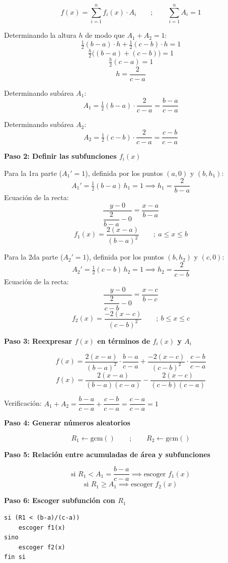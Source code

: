 \[
f(x) = \sum_{i=1}^{n} f_i(x) \cdot A_i \qquad ; \qquad \sum_{i=1}^{n} A_i = 1
\]

Determinando la altura $h$ de modo que $A_1 + A_2 = 1$:
\[
\tfrac{1}{2}(b-a)\cdot h + \tfrac{1}{2}(c-b)\cdot h = 1
\]
\[
\tfrac{h}{2}\big((b-a)+(c-b)\big) = 1
\]
\[
\tfrac{h}{2}(c-a) = 1
\]
\[
h = \frac{2}{c-a}
\]

Determinando subárea $A_1$:
\[
A_1 = \tfrac{1}{2}(b-a)\cdot\frac{2}{c-a} = \frac{b-a}{c-a}
\]

Determinando subárea $A_2$:
\[
A_2 = \tfrac{1}{2}(c-b)\cdot\frac{2}{c-a} = \frac{c-b}{c-a}
\]

\textbf{Paso 2: Definir las subfunciones $f_i(x)$}

Para la 1ra parte ($A_1'=1$), definida por los puntos $(a,0)$ y $(b,h_1)$:
\[
A_1' = \tfrac{1}{2}(b-a)\,h_1 = 1 \implies h_1 = \frac{2}{b-a}
\]
Ecuación de la recta:
\[
\frac{y - 0}{\dfrac{2}{b-a} - 0} = \frac{x - a}{b - a}
\]
\[
f_1(x) = \frac{2(x-a)}{(b-a)^2} \qquad ;\ a \leq x \leq b
\]

Para la 2da parte ($A_2'=1$), definida por los puntos $(b,h_2)$ y $(c,0)$:
\[
A_2' = \tfrac{1}{2}(c-b)\,h_2 = 1 \implies h_2 = \frac{2}{c-b}
\]
Ecuación de la recta:
\[
\frac{y - 0}{\dfrac{2}{c-b} - 0} = \frac{x - c}{b - c}
\]
\[
f_2(x) = \frac{-2(x-c)}{(c-b)^2} \qquad ;\ b \leq x \leq c
\]

\textbf{Paso 3: Reexpresar $f(x)$ en términos de $f_i(x)$ y $A_i$}

\[
f(x) = \frac{2(x-a)}{(b-a)^2}\cdot\frac{b-a}{c-a} + \frac{-2(x-c)}{(c-b)^2}\cdot\frac{c-b}{c-a}
\]
\[
f(x) = \frac{2(x-a)}{(b-a)(c-a)} - \frac{2(x-c)}{(c-b)(c-a)}
\]

Verificación: $A_1+A_2 = \dfrac{b-a}{c-a}+\dfrac{c-b}{c-a} = \dfrac{c-a}{c-a} = 1$ \checkmark

\textbf{Paso 4: Generar números aleatorios}

\[
R_1 \leftarrow \text{gcm}() \qquad ; \qquad R_2 \leftarrow \text{gcm}()
\]

\textbf{Paso 5: Relación entre acumuladas de área y subfunciones}

\[
\text{si } R_1 < A_1 = \frac{b-a}{c-a} \implies \text{escoger } f_1(x)
\]
\[
\text{si } R_1 \geq A_1 \implies \text{escoger } f_2(x)
\]

\textbf{Paso 6: Escoger subfunción con $R_1$}

\begin{lstlisting}[caption={Selección de subfunción}, language=Pascal]
si (R1 < (b-a)/(c-a))
    escoger f1(x)
sino
    escoger f2(x)
fin si
\end{lstlisting}

